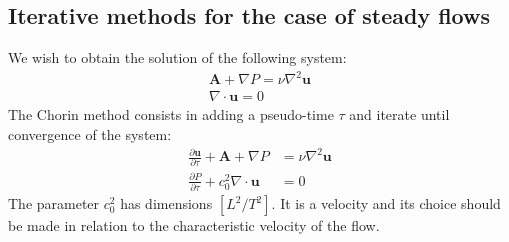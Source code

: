 \documentclass[12pt, openany]{report}
\theoremstyle{definition}
\begin{document}
\subsection{Iterative methods for the case of steady flows}
We wish to obtain the solution of the following system:
\begin{equation}
	\begin{aligned}
		\boldsymbol{A} + \nabla P = \nu \nabla^2 \boldsymbol{u}\\
		\nabla \cdot \boldsymbol{u}=0
	\end{aligned}
\end{equation}
The Chorin method consists in adding a pseudo-time $\tau$ and iterate until convergence of the system:
\begin{equation}
	\begin{aligned}
		\frac{\partial \boldsymbol{u}}{\partial \tau}+ \boldsymbol{A} + \nabla P &= \nu \nabla^2 \boldsymbol{u}\\
		\frac{\partial P}{\partial \tau} + c_0^2 \nabla \cdot \boldsymbol{u}&=0
	\end{aligned}
\end{equation}
The parameter $c_0^2$ has dimensions $[L^2/T^2]$. It is a velocity and its choice should be made in relation to the characteristic velocity of the flow. 
\end{document}
